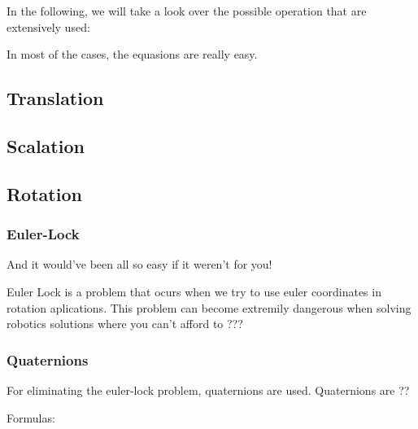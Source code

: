 In the following, we will take a look over the possible operation that are extensively used:

In most of the cases, the equasions are really easy.

\subsection*{Translation}
\subsection*{Scalation}
\subsection*{Rotation}
\subsubsection*{Euler-Lock}
And it would've been all so easy if it weren't for you! 

Euler Lock is a problem that ocurs when we try to use euler coordinates in rotation aplications. This problem can become extremily dangerous when solving robotics solutions where you can't afford to ???

\subsubsection*{Quaternions}
For eliminating the euler-lock problem, quaternions are used. Quaternions are ??

Formulas:







